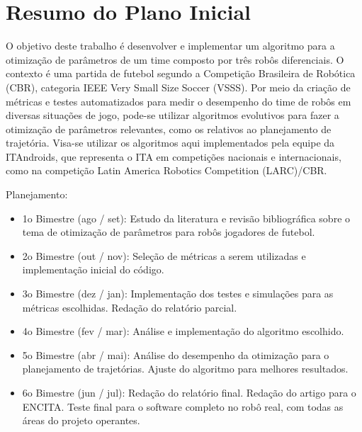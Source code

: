 \documentclass[a4paper,12pt]{article}
\begin{document}




\tableofcontents

\newpage

\section{Resumo do Plano Inicial}
\label{secao:plano_inicial}

O objetivo deste trabalho é desenvolver e implementar um algoritmo para a otimização de parâmetros de um time composto por três robôs diferenciais. O contexto é uma partida de futebol segundo a Competição Brasileira de Robótica (CBR), categoria IEEE Very Small Size Soccer (VSSS). Por meio da criação de métricas e testes automatizados para medir o desempenho do time de robôs em diversas situações de jogo, pode-se utilizar algoritmos evolutivos para fazer a otimização de parâmetros relevantes, como os relativos ao planejamento de trajetória. Visa-se utilizar os algoritmos aqui implementados pela equipe da ITAndroids, que representa o ITA em competições nacionais e internacionais, como na competição Latin America Robotics Competition (LARC)/CBR.

Planejamento:
\begin{itemize}

\item 1o Bimestre (ago / set): Estudo da literatura e revisão bibliográfica sobre o tema de otimização de parâmetros para robôs jogadores de futebol.

\item 2o Bimestre (out / nov): Seleção de métricas a serem utilizadas e implementação inicial do código.

\item 3o Bimestre (dez / jan): Implementação dos testes e simulações para as métricas escolhidas. Redação do relatório parcial.

\item 4o Bimestre (fev / mar): Análise e implementação do algoritmo escolhido.

\item 5o Bimestre (abr / mai): Análise do desempenho da otimização para o planejamento de trajetórias. Ajuste do algoritmo para melhores resultados.

\item 6o Bimestre (jun / jul): Redação do relatório final. Redação do artigo para o ENCITA. Teste final para o software completo no robô real, com todas as áreas do projeto operantes.

\end{itemize}
\end{document}
